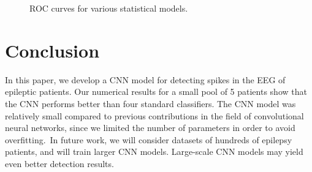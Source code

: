 \documentclass{article}
\begin{document}
\begin{figure}[htb]
    \centering
    \setlength\fboxsep{0pt}
    \setlength{}
    \caption{ROC curves for various statistical models.}
    \label{fig:ROC}
\end{figure}

\section{Conclusion}

In this paper, we develop a CNN model for detecting spikes in the EEG of epileptic patients.
Our numerical results for a small pool of 5 patients show that the CNN performs better than four standard classifiers.
The CNN model was relatively small compared to previous contributions in the field of convolutional neural networks, since we limited the number of parameters in order to avoid overfitting.~In future work, we will consider datasets of hundreds of epilepsy patients, and will train larger CNN models. Large-scale CNN models may yield even better detection results.



\end{document}
